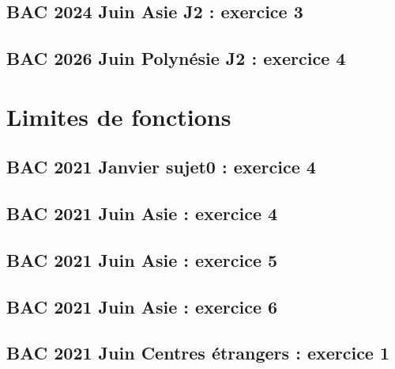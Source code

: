 \documentclass[lang=fr,edition=teacher,layout=sheet]{mxbook}
\begin{document}
\begingroup\endgroup
\par\bigskip
{}\subsection*{BAC 2024 Juin Asie J2 : exercice 3}
\begingroup\endgroup
\par\bigskip
{}\subsection*{BAC 2026 Juin Polynésie J2 : exercice 4}
\begingroup\endgroup
\par\bigskip
\clearpage\section*{Limites de fonctions}
\subsection*{BAC 2021 Janvier sujet0 : exercice 4}
\begingroup\endgroup
\par\bigskip
{}\subsection*{BAC 2021 Juin Asie : exercice 4}
\begingroup\endgroup
\par\bigskip
{}\subsection*{BAC 2021 Juin Asie : exercice 5}
\begingroup\endgroup
\par\bigskip
{}\subsection*{BAC 2021 Juin Asie : exercice 6}
\begingroup\endgroup
\par\bigskip
{}\subsection*{BAC 2021 Juin Centres étrangers : exercice 1}
\end{document}
